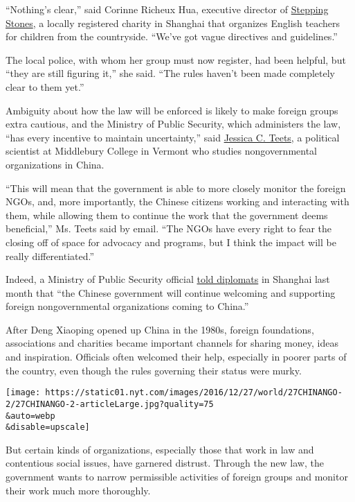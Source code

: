 ``Nothing's clear,'' said Corinne Richeux Hua, executive director of
\href{http://steppingstoneschina.net/}{Stepping Stones}, a locally
registered charity in Shanghai that organizes English teachers for
children from the countryside. ``We've got vague directives and
guidelines.''

The local police, with whom her group must now register, had been
helpful, but ``they are still figuring it,'' she said. ``The rules
haven't been made completely clear to them yet.''

Ambiguity about how the law will be enforced is likely to make foreign
groups extra cautious, and the Ministry of Public Security, which
administers the law, ``has every incentive to maintain uncertainty,''
said
\href{http://www.middlebury.edu/academics/ps/faculty/node/25661}{Jessica
C. Teets}, a political scientist at Middlebury College in Vermont who
studies nongovernmental organizations in China.

``This will mean that the government is able to more closely monitor the
foreign NGOs, and, more importantly, the Chinese citizens working and
interacting with them, while allowing them to continue the work that the
government deems beneficial,'' Ms. Teets said by email. ``The NGOs have
every right to fear the closing off of space for advocacy and programs,
but I think the impact will be really differentiated.''

Indeed, a Ministry of Public Security official
\href{http://www.mps.gov.cn/n2253534/n2253535/n2253537/c5542815/content.html}{told
diplomats} in Shanghai last month that ``the Chinese government will
continue welcoming and supporting foreign nongovernmental organizations
coming to China.''

After Deng Xiaoping opened up China in the 1980s, foreign foundations,
associations and charities became important channels for sharing money,
ideas and inspiration. Officials often welcomed their help, especially
in poorer parts of the country, even though the rules governing their
status were murky.

\texttt{[image: https://static01.nyt.com/images/2016/12/27/world/27CHINANGO-2/27CHINANGO-2-articleLarge.jpg?quality=75\\\&auto=webp\\\&disable=upscale]}

But certain kinds of organizations, especially those that work in law
and contentious social issues, have garnered distrust. Through the new
law, the government wants to narrow permissible activities of foreign
groups and monitor their work much more thoroughly.

